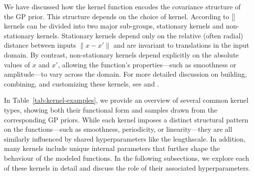 \documentclass[11pt]{article}
\begin{document}
\noindent
We have discussed how the kernel function encodes the covariance structure of the GP prior. This structure depends on the choice of kernel. According to [\cite{bible}]
kernels can be divided into two major sub-groups, stationary kernels and non-stationary kernels. 
Stationary kernels depend only on the relative (often radial) distance between inputs \(\|x - x'\|\) and are invariant to translations 
in the input domain. By contrast, non-stationary kernels depend explicitly on 
the absolute values of \(x\) and \(x'\), allowing the function’s properties—such as smoothness 
or amplitude—to vary across the domain. For more detailed discussion on building, combining, and customizing these kernels, 
see \cite{kernelcookbook} and \cite[Ch.~4]{bible}.

\bigskip

\noindent
In Table~\ref{tab:kernel-examples}, we provide an overview of several common kernel types, 
showing both their functional form and samples drawn from the corresponding GP priors. 
While each kernel imposes a distinct structural pattern on the functions—such as smoothness, periodicity, or linearity—they are all similarly influenced by shared hyperparameters like the lengthscale. 
In addition, many kernels include unique internal parameters that further shape the behaviour of the modeled functions. 
In the following subsections, we explore each of these kernels in detail and discuss the role of their associated hyperparameters.
\end{document}
